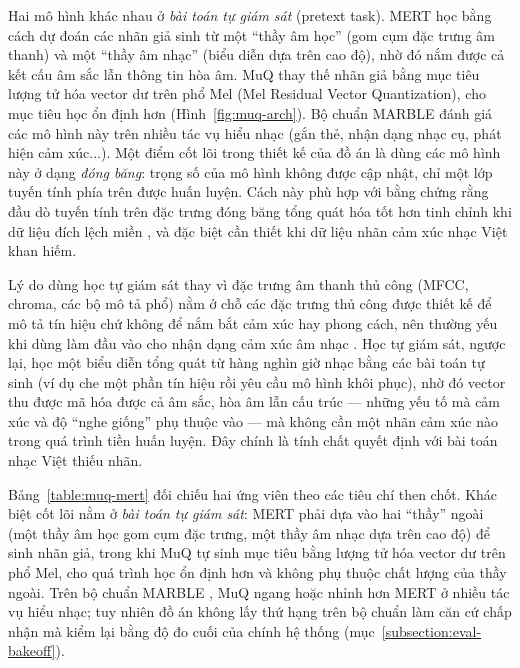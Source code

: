\documentclass[../DoAn.tex]{subfiles}
\begin{document}
Hai mô hình khác nhau ở \textit{bài toán tự giám sát} (pretext task). MERT học bằng cách dự đoán các nhãn giả sinh từ một ``thầy âm học'' (gom cụm đặc trưng âm thanh) và một ``thầy âm nhạc'' (biểu diễn dựa trên cao độ), nhờ đó nắm được cả kết cấu âm sắc lẫn thông tin hòa âm. MuQ thay thế nhãn giả bằng mục tiêu lượng tử hóa vector dư trên phổ Mel (Mel Residual Vector Quantization), cho mục tiêu học ổn định hơn (Hình~\ref{fig:muq-arch}). Bộ chuẩn MARBLE \cite{yuan2023marble} đánh giá các mô hình này trên nhiều tác vụ hiểu nhạc (gắn thẻ, nhận dạng nhạc cụ, phát hiện cảm xúc...). Một điểm cốt lõi trong thiết kế của đồ án là dùng các mô hình này ở dạng \textit{đóng băng}: trọng số của mô hình không được cập nhật, chỉ một lớp tuyến tính phía trên được huấn luyện. Cách này phù hợp với bằng chứng rằng đầu dò tuyến tính trên đặc trưng đóng băng tổng quát hóa tốt hơn tinh chỉnh khi dữ liệu đích lệch miền \cite{kumar2022finetuning}, và đặc biệt cần thiết khi dữ liệu nhãn cảm xúc nhạc Việt khan hiếm.

Lý do dùng học tự giám sát thay vì đặc trưng âm thanh thủ công (MFCC, chroma, các bộ mô tả phổ) nằm ở chỗ các đặc trưng thủ công được thiết kế để mô tả tín hiệu chứ không để nắm bắt cảm xúc hay phong cách, nên thường yếu khi dùng làm đầu vào cho nhận dạng cảm xúc âm nhạc \cite{yang2012mer}. Học tự giám sát, ngược lại, học một biểu diễn tổng quát từ hàng nghìn giờ nhạc bằng các bài toán tự sinh (ví dụ che một phần tín hiệu rồi yêu cầu mô hình khôi phục), nhờ đó vector thu được mã hóa được cả âm sắc, hòa âm lẫn cấu trúc --- những yếu tố mà cảm xúc và độ ``nghe giống'' phụ thuộc vào --- mà không cần một nhãn cảm xúc nào trong quá trình tiền huấn luyện. Đây chính là tính chất quyết định với bài toán nhạc Việt thiếu nhãn.

Bảng~\ref{table:muq-mert} đối chiếu hai ứng viên theo các tiêu chí then chốt. Khác biệt cốt lõi nằm ở \textit{bài toán tự giám sát}: MERT phải dựa vào hai ``thầy'' ngoài (một thầy âm học gom cụm đặc trưng, một thầy âm nhạc dựa trên cao độ) để sinh nhãn giả, trong khi MuQ tự sinh mục tiêu bằng lượng tử hóa vector dư trên phổ Mel, cho quá trình học ổn định hơn và không phụ thuộc chất lượng của thầy ngoài. Trên bộ chuẩn MARBLE \cite{yuan2023marble}, MuQ ngang hoặc nhỉnh hơn MERT ở nhiều tác vụ hiểu nhạc; tuy nhiên đồ án không lấy thứ hạng trên bộ chuẩn làm căn cứ chấp nhận mà kiểm lại bằng độ đo cuối của chính hệ thống (mục~\ref{subsection:eval-bakeoff}).
\end{document}
